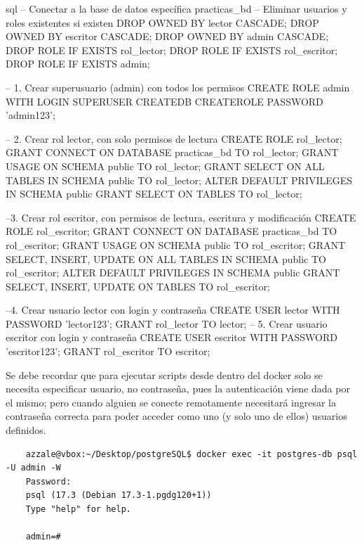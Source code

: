\documentclass{article}
\begin{document}
\begin{codebox}{sql}
-- Conectar a la base de datos específica
\connect practicas_bd
    -- Eliminar usuarios y roles existentes si existen
    DROP OWNED BY lector CASCADE;
    DROP OWNED BY escritor CASCADE;
    DROP OWNED BY admin CASCADE;
    DROP ROLE IF EXISTS rol_lector;
    DROP ROLE IF EXISTS rol_escritor;
    DROP ROLE IF EXISTS admin;

    -- 1. Crear superusuario (admin) con todos los permisos
    CREATE ROLE admin WITH LOGIN SUPERUSER CREATEDB CREATEROLE PASSWORD 'admin123';

    -- 2. Crear rol lector, con  solo permisos de lectura
    CREATE ROLE rol_lector;
    GRANT CONNECT ON DATABASE practicas_bd TO rol_lector;
    GRANT USAGE ON SCHEMA public TO rol_lector;
    GRANT SELECT ON ALL TABLES IN SCHEMA public TO rol_lector;
    ALTER DEFAULT PRIVILEGES IN SCHEMA public GRANT SELECT ON TABLES TO rol_lector;
    
    --3.  Crear rol escritor, con permisos de lectura, escritura y modificación
    CREATE ROLE rol_escritor;
    GRANT CONNECT ON DATABASE practicas_bd TO rol_escritor;
    GRANT USAGE ON SCHEMA public TO rol_escritor;
    GRANT SELECT, INSERT, UPDATE ON ALL TABLES IN SCHEMA public TO rol_escritor;
    ALTER DEFAULT PRIVILEGES IN SCHEMA public GRANT SELECT, INSERT, UPDATE ON TABLES TO rol_escritor;

    --4. Crear usuario lector con login y contraseña
    CREATE USER lector WITH PASSWORD 'lector123';
    GRANT rol_lector TO lector;
    -- 5. Crear usuario escritor con login y contraseña
    CREATE USER escritor WITH PASSWORD 'escritor123';
    GRANT rol_escritor TO escritor;
\end{codebox}

Se debe recordar que para ejecutar scripts desde dentro del docker solo se necesita especificar usuario, no contraseña, pues la autenticación viene dada por el mismo; pero cuando alguien se conecte remotamente necesitará ingresar la contraseña correcta para poder acceder como uno (y solo uno de ellos) usuarios definidos.


\begin{tcolorbox}[colback=black, coltext=white, fontupper=\ttfamily, title=Terminal]
\begin{verbatim}
    azzale@vbox:~/Desktop/postgreSQL$ docker exec -it postgres-db psql -U admin -W
    Password: 
    psql (17.3 (Debian 17.3-1.pgdg120+1))
    Type "help" for help.

    admin=# 
\end{verbatim}
\end{tcolorbox}
\end{document}
